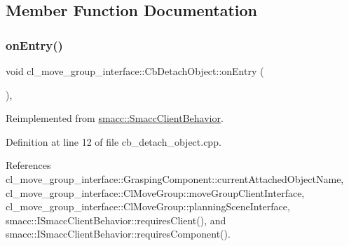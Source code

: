 \subsection{Member Function Documentation}
\mbox{\label{classcl__move__group__interface_1_1CbDetachObject_a04af88f1d9b64c43eb2620ac5bd62c35}} 
\subsubsection{\texorpdfstring{on\+Entry()}{onEntry()}}
{\footnotesize\ttfamily void cl\+\_\+move\+\_\+group\+\_\+interface\+::\+Cb\+Detach\+Object\+::on\+Entry (\begin{DoxyParamCaption}{ }\end{DoxyParamCaption})\hspace{0.3cm}{\ttfamily [override]}, {\ttfamily [virtual]}}



Reimplemented from \hyperlink{classsmacc_1_1SmaccClientBehavior_ad5d3e1f1697c3cfe66c94cadba948493}{smacc\+::\+Smacc\+Client\+Behavior}.



Definition at line 12 of file cb\+\_\+detach\+\_\+object.\+cpp.



References cl\+\_\+move\+\_\+group\+\_\+interface\+::\+Grasping\+Component\+::current\+Attached\+Object\+Name, cl\+\_\+move\+\_\+group\+\_\+interface\+::\+Cl\+Move\+Group\+::move\+Group\+Client\+Interface, cl\+\_\+move\+\_\+group\+\_\+interface\+::\+Cl\+Move\+Group\+::planning\+Scene\+Interface, smacc\+::\+I\+Smacc\+Client\+Behavior\+::requires\+Client(), and smacc\+::\+I\+Smacc\+Client\+Behavior\+::requires\+Component().


